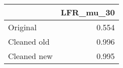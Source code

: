 \begin{tabular}{lr}
\toprule
{} & LFR_mu_30 \\
\midrule
Original    &     0.554 \\
Cleaned old &     0.996 \\
Cleaned new &     0.995 \\
\bottomrule
\end{tabular}
